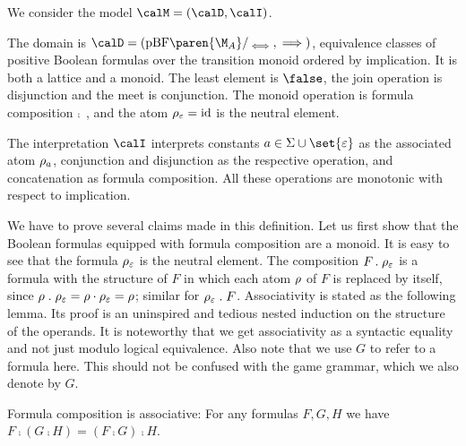 \documentclass[../../diss.tex]{subfiles}
\begin{document}
\begin{definition}%
\label{Definition:CFModel}%
    We consider the model $\model = (\domain, \interpretation)$.

    The domain is $\domain = (\pBF\paren{\nfatransmonoid{A}}/_{\lequiv},\lleq)$, equivalence classes of positive Boolean formulas over the transition monoid ordered by implication.
    It is both a lattice and a monoid.
    The least element is $\false$, the join operation is disjunction and the meet is conjunction.
    The monoid operation is formula composition $\comp$\ , and the atom $\tbox{\eps} = \id$ is the neutral element.

    The interpretation $\calI$ interprets constants $a \in \Sigma \cup \set{\eps}$ as the associated atom $\tbox{a}$, conjunction and disjunction as the respective operation, and concatenation as formula composition.
    All these operations are monotonic with respect to implication.
\end{definition}

We have to prove several claims made in this definition.
Let us first show that the Boolean formulas equipped with formula composition are a monoid.
It is easy to see that the formula $\tbox{\eps}$ is the neutral element.
The composition $F \comp \tbox{\eps}$ is a formula with the structure of $F$ in which each atom $\tbox$ of $F$ is replaced by itself, since $\tbox \comp \tbox{\eps} = \tbox \relcomp \tbox{\eps} = \tbox$; similar for $\tbox{\eps} \comp F$.
Associativity is stated as the following lemma.
Its proof is an uninspired and tedious nested induction on the structure of the operands.
It is noteworthy that we get associativity as a syntactic equality and not just modulo logical equivalence.
Also note that we use $G$ to refer to a formula here.
This should not be confused with the game grammar, which we also denote by $G$.

\begin{lemma}%
\label{Lemma:CFGamesCompositionAssociative}%
    Formula composition is associative: For any formulas $F, G, H$ we have $F \comp (G \comp H) = (F \comp G) \comp H$.
\end{lemma}
\end{document}
